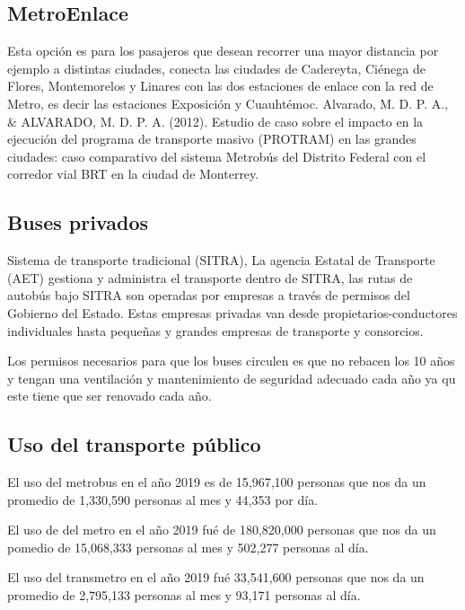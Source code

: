 \documentclass[a4paper]{article}
\begin{document}
\autocite{Manchester}

\subsection{MetroEnlace}
Esta opción es para los pasajeros que desean recorrer una mayor distancia por ejemplo a distintas ciudades, conecta las ciudades de Cadereyta, Ciénega de Flores, Montemorelos y Linares con las dos estaciones de enlace con la red de Metro, es decir las estaciones Exposición y Cuauhtémoc. 
Alvarado, M. D. P. A., \& ALVARADO, M. D. P. A. (2012). Estudio de caso sobre el impacto en la ejecución del programa de transporte masivo (PROTRAM) en las grandes ciudades: caso comparativo del sistema Metrobús del Distrito Federal con el corredor vial BRT en la ciudad de Monterrey.

\autocite{Manchester}

\subsection{Buses privados}
Sistema de transporte tradicional (SITRA), La agencia Estatal de Transporte (AET) gestiona y administra el transporte dentro de SITRA, las rutas de autobús bajo SITRA son operadas por empresas a través de permisos del Gobierno del Estado. Estas empresas privadas van desde propietarios-conductores individuales hasta pequeñas y grandes empresas de transporte y consorcios.


Los permisos necesarios para que los buses circulen es que no rebacen los 10 años y tengan una  ventilación y mantenimiento de seguridad adecuado cada año ya qu este tiene que ser renovado cada año.

\autocite{Manchester}

\subsection{Uso del transporte público}

El uso del metrobus en el año 2019 es de 15,967,100 personas que nos da un promedio de 1,330,590  personas al mes y 44,353 por día.

El uso de  del metro en el año 2019 fué de 180,820,000 personas que nos da un pomedio de 15,068,333 personas  al mes y 502,277 personas al día.

El uso del transmetro en el año 2019 fué 33,541,600 personas  que nos da un promedio de 2,795,133 personas al mes y  93,171  personas al día.  
\end{document}
